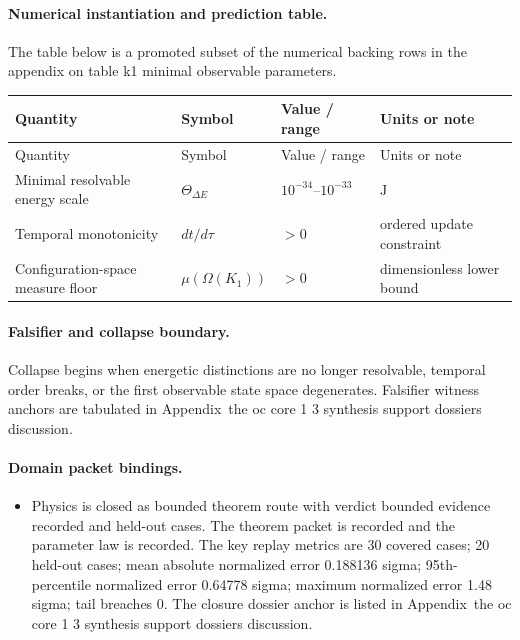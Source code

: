 \paragraph{Numerical instantiation and prediction table.}
The table below is a promoted subset of the numerical backing rows in the appendix on table k1 minimal observable parameters.
\begin{longtable}{@{}L{0.27\textwidth}L{0.15\textwidth}L{0.24\textwidth}L{0.16\textwidth}@{}}
\toprule
Quantity & Symbol & Value / range & Units or note \\
\midrule
\endfirsthead
\toprule
Quantity & Symbol & Value / range & Units or note \\
\midrule
\endhead
Minimal resolvable energy scale & $\scriptstyle \Theta_{\Delta E}$ & $10^{-34}\text{--}10^{-33}$ & $\mathrm{J}$ \\
Temporal monotonicity & $\scriptstyle dt/\allowbreak d\tau$ & $> 0$ & ordered update constraint \\
Configuration-space measure floor & $\scriptstyle \mu(\Omega(K_1))$ & $> 0$ & dimensionless lower bound \\
\bottomrule
\end{longtable}

\paragraph{Falsifier and collapse boundary.}
Collapse begins when energetic distinctions are no longer resolvable, temporal order breaks, or the first observable state space degenerates.
Falsifier witness anchors are tabulated in Appendix~the oc core 1 3 synthesis support dossiers discussion.

\paragraph{Domain packet bindings.}
\begin{itemize}[leftmargin=1.6em,nosep]
\item Physics is closed as bounded theorem route with verdict bounded evidence recorded and  held-out cases. The theorem packet is recorded and the parameter law is recorded. The key replay metrics are 30 covered cases; 20 held-out cases; mean absolute normalized error 0.188136 sigma; 95th-percentile normalized error 0.64778 sigma; maximum normalized error 1.48 sigma; tail breaches 0. The closure dossier anchor is listed in Appendix~the oc core 1 3 synthesis support dossiers discussion.
\end{itemize}

